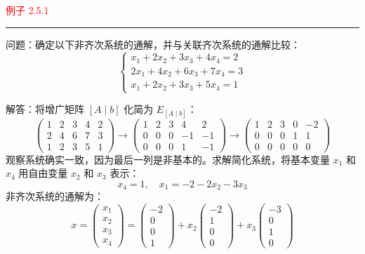 \textcolor{red}{例子 2.5.1}
\color{red}\rule{\textwidth}{0.4pt}\color{black}

问题：确定以下非齐次系统的通解，并与关联齐次系统的通解比较：
\[
\begin{cases}
x_{1} + 2x_{2} + 3x_{3} + 4x_{4} = 2 \\
2x_{1} + 4x_{2} + 6x_{3} + 7x_{4} = 3 \\
x_{1} + 2x_{2} + 3x_{3} + 5x_{4} = 1
\end{cases}
\]

解答：将增广矩阵 \([A \mid b]\) 化简为 \(E_{[A \mid b]}\)：
\[
\begin{pmatrix}
1 & 2 & 3 & 4 & 2 \\
2 & 4 & 6 & 7 & 3 \\
1 & 2 & 3 & 5 & 1
\end{pmatrix}
\rightarrow
\begin{pmatrix}
1 & 2 & 3 & 4 & 2 \\
0 & 0 & 0 & -1 & -1 \\
0 & 0 & 0 & 1 & -1
\end{pmatrix}
\rightarrow
\begin{pmatrix}
1 & 2 & 3 & 0 & -2 \\
0 & 0 & 0 & 1 & 1 \\
0 & 0 & 0 & 0 & 0
\end{pmatrix}
\]
观察系统确实一致，因为最后一列是非基本的。求解简化系统，将基本变量 \(x_{1}\) 和 \(x_{4}\) 用自由变量 \(x_{2}\) 和 \(x_{3}\) 表示：
\[
x_{4} = 1, \quad x_{1} = -2 - 2x_{2} - 3x_{3}
\]
非齐次系统的通解为：
\[
x = \begin{pmatrix} x_{1} \\ x_{2} \\ x_{3} \\ x_{4} \end{pmatrix} =
\begin{pmatrix} -2 \\ 0 \\ 0 \\ 1 \end{pmatrix} +
x_{2} \begin{pmatrix} -2 \\ 1 \\ 0 \\ 0 \end{pmatrix} +
x_{3} \begin{pmatrix} -3 \\ 0 \\ 1 \\ 0 \end{pmatrix}
\]
